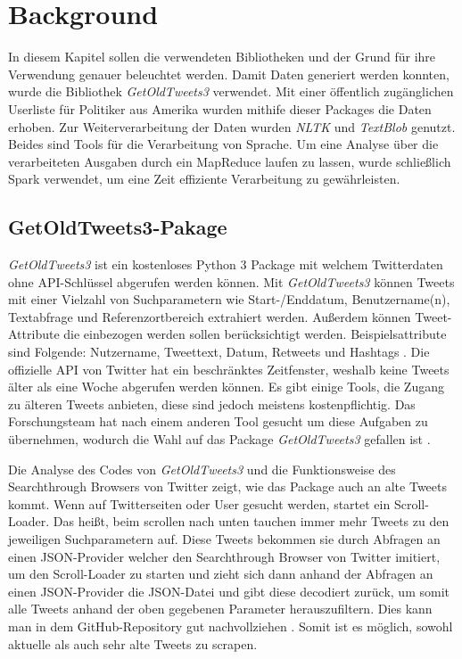 \section{Background}

In diesem Kapitel sollen die verwendeten Bibliotheken und der Grund für ihre Verwendung genauer beleuchtet werden. Damit Daten generiert werden konnten, wurde die Bibliothek \textit{GetOldTweets3} verwendet. Mit einer öffentlich zugänglichen Userliste für Politiker aus Amerika wurden mithife dieser Packages die Daten erhoben. Zur Weiterverarbeitung der Daten wurden \textit{NLTK} und \textit{TextBlob} genutzt. Beides sind Tools für die Verarbeitung von Sprache. Um eine Analyse über die verarbeiteten Ausgaben durch ein MapReduce laufen zu lassen, wurde schließlich Spark verwendet, um eine Zeit effiziente Verarbeitung zu gewährleisten.
	
\subsection{GetOldTweets3-Pakage}
	
\textit{GetOldTweets3} ist ein kostenloses Python 3 Package mit welchem Twitterdaten ohne API-Schlüssel abgerufen werden können. Mit \textit{GetOldTweets3} können Tweets mit einer Vielzahl von Suchparametern wie Start-/Enddatum, Benutzername(n), Textabfrage und Referenzortbereich extrahiert werden. Außerdem können Tweet-Attribute die einbezogen werden sollen berücksichtigt werden. Beispielsattribute sind Folgende: Nutzername, Tweettext, Datum, Retweets und Hashtags . Die offizielle API von Twitter hat ein beschränktes Zeitfenster, weshalb keine Tweets älter als eine Woche abgerufen werden können. Es gibt einige Tools, die Zugang zu älteren Tweets anbieten, diese sind jedoch meistens kostenpflichtig. Das Forschungsteam hat nach einem anderen Tool gesucht um diese Aufgaben zu übernehmen, wodurch die Wahl auf das Package  \textit{GetOldTweets3} gefallen ist .

Die Analyse des Codes von \textit{GetOldTweets3} und die Funktionsweise des Searchthrough Browsers von Twitter zeigt, wie das Package auch an alte Tweets kommt. Wenn auf Twitterseiten oder User gesucht werden, startet ein Scroll-Loader. Das heißt, beim scrollen nach unten tauchen immer mehr Tweets zu den jeweiligen Suchparametern auf. Diese Tweets bekommen sie durch Abfragen an einen JSON-Provider welcher den Searchthrough Browser von Twitter imitiert, um den Scroll-Loader zu starten und zieht sich dann anhand der Abfragen an einen JSON-Provider die JSON-Datei und gibt diese decodiert zurück, um somit alle Tweets anhand der oben gegebenen Parameter herauszufiltern. Dies kann man in dem GitHub-Repository gut nachvollziehen . Somit ist es möglich, sowohl aktuelle als auch sehr alte Tweets zu scrapen.
	
